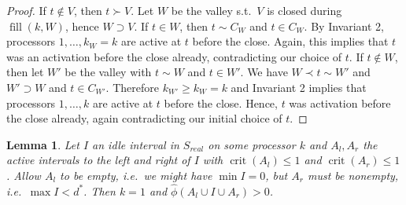 \documentclass[a4paper]{article}
\DeclareMathOperator{\crit}{crit}
\DeclareMathOperator{\fillop}{fill}
\newtheorem{lemma}[theorem]{Lemma}
\begin{document}
\begin{proof}
  If $t \notin V$, then $t \succ V$.
  Let $W$ be the valley s.t.\ $V$ is closed during $\fillop(k, W)$, hence $W \supset V$.
  If $t \in W$, then $t \sim C_W$ and $t \in C_W$.
  By Invariant 2, processors $1, \ldots, k_W = k$ are active at $t$ before the close.
  Again, this implies that $t$ was an activation before the close already, contradicting our choice of $t$.
  If $t \notin W$, then let $W'$ be the valley with $t \sim W$ and $t \in W'$.
  We have $W \prec t \sim W'$ and $W' \supset W$ and $t \in C_{W'}$.
  Therefore $k_{W'} \geq k_W = k$ and Invariant 2 implies that processors $1, \ldots, k$ are active at $t$ before the close.
  Hence, $t$ was activation before the close already, again contradicting our initial choice of $t$.
\end{proof}
\begin{lemma}\label{lemma:constellation}
  Let $I$ an idle interval in $S_{real}$ on some processor $k$ and $A_l, A_r$ the active intervals to the left and right of $I$ with $\crit(A_l) \leq 1$ and $\crit(A_r) \leq 1$.
  Allow $A_l$ to be empty, i.e.\ we might have $\min I = 0$, but $A_r$ must be nonempty, i.e.\ $\max I < d^*$.
  Then $k = 1$ and $\hat \phi(A_l \cup I \cup A_r) > 0$.
\end{lemma}
\end{document}

